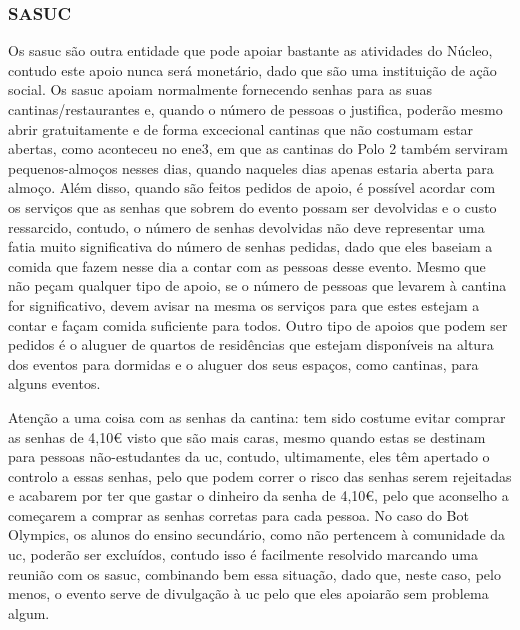 
\subsubsection{SASUC}

Os \acrfull{sasuc} são outra entidade que pode apoiar bastante as atividades do Núcleo, contudo este apoio nunca será monetário, dado que são uma instituição de ação social. Os \acrshort{sasuc} apoiam normalmente fornecendo senhas para as suas cantinas/restaurantes e, quando o número de pessoas o justifica, poderão mesmo abrir gratuitamente e de forma excecional cantinas que não costumam estar abertas, como aconteceu no \acrshort{ene3}, em que as cantinas do Polo 2 também serviram pequenos-almoços nesses dias, quando naqueles dias apenas estaria aberta para almoço. Além disso, quando são feitos pedidos de apoio, é possível acordar com os serviços que as senhas que sobrem do evento possam ser devolvidas e o custo ressarcido, contudo, o número de senhas devolvidas não deve representar uma fatia muito significativa do número de senhas pedidas, dado que eles baseiam a comida que fazem nesse dia a contar com as pessoas desse evento. Mesmo que não peçam qualquer tipo de apoio, se o número de pessoas que levarem à cantina for significativo, devem avisar na mesma os serviços para que estes estejam a contar e façam comida suficiente para todos. Outro tipo de apoios que podem ser pedidos é o aluguer de quartos de residências que estejam disponíveis na altura dos eventos para dormidas e o aluguer dos seus espaços, como cantinas, para alguns eventos.

Atenção a uma coisa com as senhas da cantina: tem sido costume evitar comprar as senhas de 4,10€ visto que são mais caras, mesmo quando estas se destinam para pessoas não-estudantes da \acrshort{uc}, contudo, ultimamente, eles têm apertado o controlo a essas senhas, pelo que podem correr o risco das senhas serem rejeitadas e acabarem por ter que gastar o dinheiro da senha de 4,10€, pelo que aconselho a começarem a comprar as senhas corretas para cada pessoa. No caso do Bot Olympics, os alunos do ensino secundário, como não pertencem à comunidade da \acrshort{uc}, poderão ser excluídos, contudo isso é facilmente resolvido marcando uma reunião com os \acrshort{sasuc}, combinando bem essa situação, dado que, neste caso, pelo menos, o evento serve de divulgação à \acrshort{uc} pelo que eles apoiarão sem problema algum.